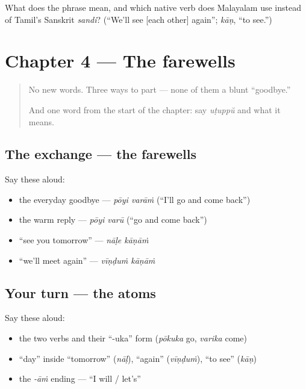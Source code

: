 \begin{tcolorbox}[breakable,colback=teal!4,colframe=teal!35!black,title={Before you move on}]
What does the phrase mean, and which native verb does Malayalam use instead of Tamil's Sanskrit \emph{sandi}? (\textquotedblleft{}We'll see {[}each other{]} again\textquotedblright{}; \emph{kāṇ}, \textquotedblleft{}to see.\textquotedblright{})
\end{tcolorbox}
\section[Practice]{Chapter 4 — The farewells}

\label{lesson:ML-C04-practice}



\begin{quote}
No new words. Three ways to part — none of them a blunt \textquotedblleft{}goodbye.\textquotedblright{}

And one word from the start of the chapter: say \emph{uṭuppŭ} and what it means.
\end{quote}

\subsection*{The exchange — the farewells}
Say these aloud:

\begin{itemize}
\raggedright
  \item the everyday goodbye — \emph{pōyi varāṁ} (\textquotedblleft{}I'll go and come back\textquotedblright{})
  \item the warm reply — \emph{pōyi varū} (\textquotedblleft{}go and come back\textquotedblright{})
  \item \textquotedblleft{}see you tomorrow\textquotedblright{} — \emph{nāḷe kāṇāṁ}
  \item \textquotedblleft{}we'll meet again\textquotedblright{} — \emph{vīṇḍuṁ kāṇāṁ}
\end{itemize}

\subsection*{Your turn — the atoms}
Say these aloud:

\begin{itemize}
\raggedright
  \item the two verbs and their \textquotedblleft{}-uka\textquotedblright{} form (\emph{pōkuka} go, \emph{varika} come)
  \item \textquotedblleft{}day\textquotedblright{} inside \textquotedblleft{}tomorrow\textquotedblright{} (\emph{nāḷ}), \textquotedblleft{}again\textquotedblright{} (\emph{vīṇḍuṁ}), \textquotedblleft{}to see\textquotedblright{} (\emph{kāṇ})
  \item the \emph{-āṁ} ending — \textquotedblleft{}I will / let's\textquotedblright{}
\end{itemize}


